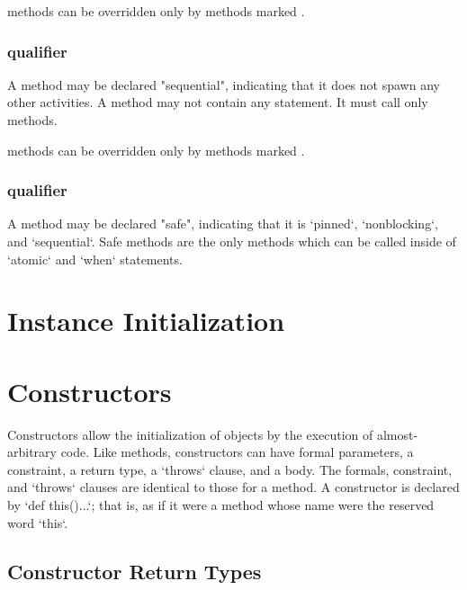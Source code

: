  methods can be overridden only by methods marked .

\subsubsection{ qualifier}
\label{SequentialAnnotation}
\label{SequentialMethod}

A method may be declared \xcd"sequential", indicating that it does not spawn
any other activities.
A  method may not contain any 
statement. It must call only  methods. 

 methods can be overridden only by methods marked .

\subsubsection{ qualifier}
\label{SafeAnnotation}
\label{SafeMethod}

A method may be declared \xcd"safe", indicating that it is 
\xcd`pinned`, \xcd`nonblocking`, and \xcd`sequential`.
Safe methods are the only methods which can be called inside of \xcd`atomic`
and \xcd`when` statements.

\section{Instance Initialization}

\section{Constructors}

Constructors allow the initialization of objects by the execution of
almost-arbitrary code.  Like methods, constructors can have formal parameters,
a constraint, a return type, a \xcd`throws` clause, and a body. The formals,
constraint, and \xcd`throws` clauses are identical to those for a method.
A constructor is declared by \xcd`def this()...`; that is, as if it were a
method whose name were the reserved word \xcd`this`.  


\subsection{Constructor Return Types}

